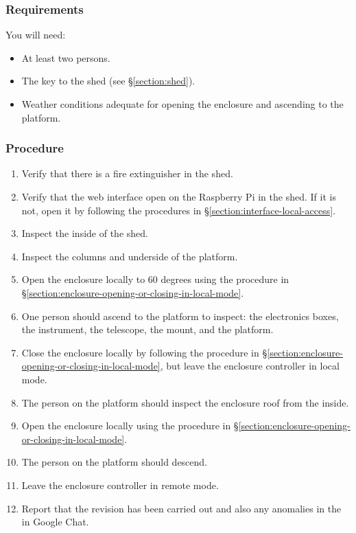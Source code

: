 

\subsubsection{Requirements}

You will need:
\begin{itemize}
    \item At least two persons.
    \item The key to the shed (see \S\ref{section:shed}).
    \item Weather conditions adequate for opening the enclosure and ascending to the platform.
\end{itemize}

\subsubsection{Procedure}

\begin{enumerate}
    \item
        Verify that there is a fire extinguisher in the shed.
    \item
        Verify that the web interface open on the Raspberry Pi in the shed. If it is not, open it by following the procedures in \S\ref{section:interface-local-access}.
    \item
        Inspect the inside of the shed.
    \item
        Inspect the columns and underside of the platform.
    \item
        Open the enclosure locally to 60 degrees using the procedure in \S\ref{section:enclosure-opening-or-closing-in-local-mode}.
    \item
        One person should ascend to the platform to inspect: the electronics boxes, the instrument, the telescope, the mount, and the platform.
    \item
        Close the enclosure locally by following the procedure in \S\ref{section:enclosure-opening-or-closing-in-local-mode}, but leave the enclosure controller in local mode.
    \item
        The person on the platform should inspect the enclosure roof from the inside.
    \item
        Open the enclosure locally using the procedure in \S\ref{section:enclosure-opening-or-closing-in-local-mode}.
    \item
        The person on the platform should descend.
    \item
        Leave the enclosure controller in remote mode.
    \item
        Report that the revision has been carried out and also any anomalies in the {\projectchat} in Google Chat.
\end{enumerate}

